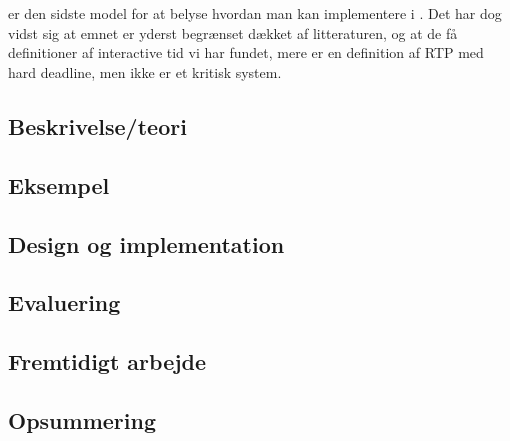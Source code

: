 \chapter{\is}
\label{chap:is}

\is er den sidste model for at belyse hvordan man kan implementere i \pycsp. Det har dog vidst sig at emnet er yderst begrænset dækket af litteraturen, og at de få definitioner af interactive tid vi har fundet, mere er en definition af RTP med hard deadline, men ikke er et kritisk system. \cite{?}
  \section{Beskrivelse/teori}
  \section{Eksempel}
  \section{Design og implementation}
  \section{Evaluering}
  \section{Fremtidigt arbejde}
  \section{Opsummering}
